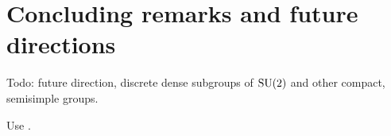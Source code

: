
\chapter{Concluding remarks and future directions}

Todo: future direction, discrete dense subgroups of $\operatorname{SU}(2)$ and other 
compact, semisimple groups. 

Use \cite{arnold-krylov-1963,breuillard-gelander-2003}. 
